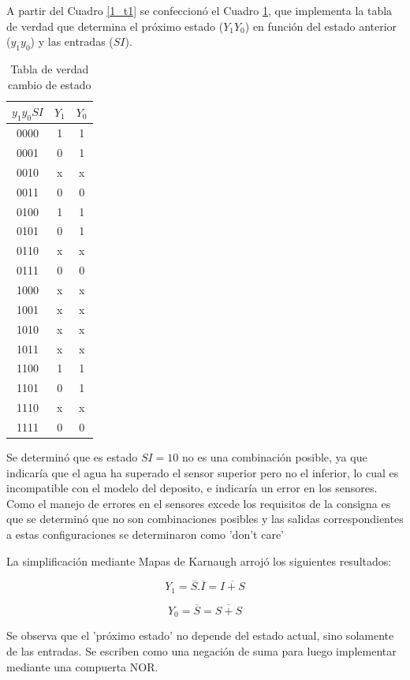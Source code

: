 \documentclass[10pt,a4paper]{article}
\begin{document}
A partir del Cuadro \ref{1_t1} se confeccionó el Cuadro \ref{1_t2}, que implementa la tabla de verdad que determina el próximo estado ($Y_1Y_0$) en función del estado anterior ($y_1y_0$) y las entradas ($SI$). 



\begin{table}[H]
	\centering
	\begin{tabular}{c|c|c}
	$y_1y_0SI$ & $Y_1$ & $Y_0$  \\ 
	\hline 
	0000 & 1 & 1  \\ 
	\hline 
	0001 & 0 & 1  \\ 
	\hline 
	0010 & x & x  \\ 
	\hline 
	0011 & 0 & 0  \\ 
	\hline 
	0100 & 1 & 1  \\ 
	\hline 
	0101 & 0 & 1  \\ 
	\hline 
	0110 & x & x  \\ 
	\hline 
	0111 & 0 & 0  \\ 
	\hline 
	1000 & x & x  \\ 
	\hline 
	1001 & x & x  \\ 
	\hline 
	1010 & x & x  \\ 
	\hline 
	1011 & x & x  \\ 
	\hline 
	1100 & 1 & 1  \\ 
	\hline 
	1101 & 0 & 1  \\ 
	\hline 
	1110 & x & x  \\ 
	\hline 
	1111 & 0 & 0  \\ 
	\end{tabular} 
	\caption{Tabla de verdad cambio de estado}
	\label{1_t2}
\end{table}

Se determinó que es estado $SI=10$ no es una combinación posible, ya que indicaría que el agua ha superado el sensor superior pero no el inferior, lo cual es incompatible con el modelo del deposito, e indicaría un error en los sensores. Como el manejo de errores en el sensores excede los requisitos de la consigna es que se determinó que no son combinaciones posibles y las salidas correspondientes a estas configuraciones se determinaron como 'don't care'

La simplificación mediante Mapas de Karnaugh arrojó los siguientes resultados:

\[
Y_1 = \overline{S}.\overline{I} = \overline{I+S}
\]

\[
Y_0 = \overline{S} = \overline{S + S}
\]

Se observa que el 'próximo estado' no depende del estado actual, sino solamente de las entradas. Se escriben como una negación de suma para luego implementar mediante una compuerta NOR.
\end{document}
